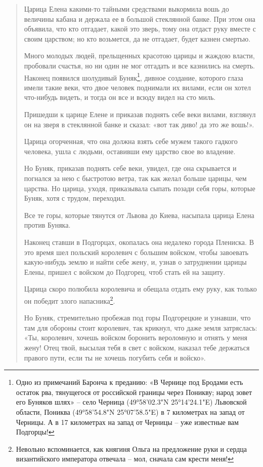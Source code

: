 \begin{quotation}
Царица Елена какими-то тайными средствами выкормила вошь до величины кабана и держала ее в большой стеклянной банке. При этом она объявила, что кто отгадает, какой это зверь, тому она отдаст руку вместе с своим царством; но кто возьмется, да не отгадает, будет казнен смертью. 

Много молодых людей, прельщенных красотою царицы и жаждою власти, пробовали счастья, но ни один не мог отгадать и все казнились на смерть. Наконец появился шолудивый Буняк\footnote{Одно из примечаний Баронча к преданию: «В Чернице под Бродами есть остаток рва, тянущегося от российской границы через Поникву; народ зовет его Буняков шлях» – село Черница (49°58'02.3"N 25°14'24.1"E) Львовской области, Пониква (49°58'54.8"N 25°07'58.5"E) в 7 километрах на запад от Черницы. А в 17 километрах на запад от Черницы – уже известные вам Подгорцы!}, дивное создание, которого глаза имели такие веки, что двое человек поднимали их вилами, если он хотел что-нибудь видеть, и тогда он все и всюду видел на сто миль. 

Пришедши к царице Елене и приказав поднять себе веки вилами, взглянул он на зверя в стеклянной банке и сказал: «вот так диво! да это же вошь!».

Царица огорченная, что она должна взять себе мужем такого гадкого человека, ушла с людьми, оставивши ему царство свое во владение.

Но Буняк, приказав поднять себе веки, увидел, где она скрывается и погнался за нею с быстротою ветра, так как желал больше царицы, чем царства. Но царица, уходя, приказывала сыпать позади себя горы, которые Буняк, хотя с трудом, переходил.

Все те горы, которые тянутся от Львова до Киева, насыпала царица Елена против Буняка.

Наконец ставши в Подгорцах, окопалась она недалеко города Плениска. В это время шел польский королевич с большим войском, чтобы завоевать какую-нибудь землю и найти себе жену, и, узнав о затруднении царицы Елены, пришел с войском до Подгорец, чтоб стать ей на защиту.

Царица скоро полюбила королевича и обещала отдать ему руку, как только он победит злого напасника\footnote{Невольно вспоминается, как княгиня Ольга на предложение руки и сердца византийского императора отвечала – мол, сначала сам крести меня!}.

Но Буняк, стремительно пробежав под горы Подгорецкие и узнавши, что там для обороны стоит королевич, так крикнул, что даже земля затряслась: «Ты, королевич, хочешь войском боронить вероломную и отнять у меня жену! Отец твой, высылая тебя в свет с войском, наказал тебе держаться правого пути, если ты не хочешь погубить себя и войско».


\end{quotation}
